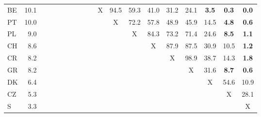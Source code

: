 \begin{table}[htbp]
\begin{tabular}{lrccccccccccccccccc}
    BE    & 10.1 &       &       &       &       &       &       &       &       & X     & 94.5 & 59.3 & 41.0 & 31.2 & 24.1 & \textbf{3.5} & \textbf{0.3} & \textbf{0.0} \\
    PT    & 10.0 &       &       &       &       &       &       &       &       &       & X     & 72.2 & 57.8 & 48.9 & 45.9 & 14.5 & \textbf{4.8} & \textbf{0.6} \\
    PL    & 9.0 &       &       &       &       &       &       &       &       &       &       & X     & 84.3 & 73.2 & 71.4 & 24.6 & \textbf{8.5} & \textbf{1.1} \\
    CH    & 8.6 &       &       &       &       &       &       &       &       &       &       &       & X     & 87.9 & 87.5 & 30.9 & 10.5 & \textbf{1.2} \\
    CR    & 8.2 &       &       &       &       &       &       &       &       &       &       &       &       & X     & 98.9 & 38.7 & 14.3 & \textbf{1.8} \\
    GR    & 8.2 &       &       &       &       &       &       &       &       &       &       &       &       &       & X     & 31.6 & \textbf{8.7} & \textbf{0.6} \\
    DK    & 6.4 &       &       &       &       &       &       &       &       &       &       &       &       &       &       & X     & 54.6 & 10.9 \\
    CZ    & 5.3 &       &       &       &       &       &       &       &       &       &       &       &       &       &       &       & X     & 28.1 \\
    S     & 3.3 &       &       &       &       &       &       &       &       &       &       &       &       &       &       &       &       & X \\
    \end{tabular}%
  \label{tab:addlabel}%
\end{table}%
